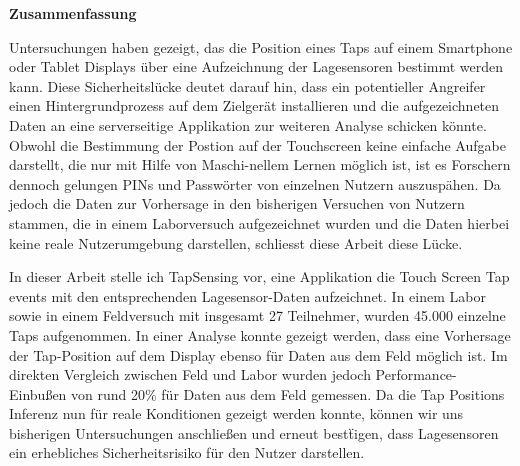 \thispagestyle{empty}
\vspace*{0.2cm}

\begin{center}
    \textbf{Zusammenfassung}
\end{center}

\vspace*{0.5cm}

\noindent

Untersuchungen haben gezeigt, das die Position eines Taps auf einem Smartphone oder Tablet Displays \"uber eine Aufzeichnung der Lagesensoren bestimmt werden kann. Diese Sicherheitsl\"ucke deutet darauf hin, dass ein potentieller Angreifer einen Hintergrundprozess auf dem Zielger\"at installieren und die aufgezeichneten Daten an eine serverseitige Applikation zur weiteren Analyse schicken k\"onnte. Obwohl die Bestimmung der Postion auf der Touchscreen keine einfache Aufgabe darstellt, die nur mit Hilfe von Maschi-nellem Lernen m\"oglich ist, ist es Forschern dennoch gelungen PINs und Passw\"orter von einzelnen Nutzern auszusp\"ahen. Da jedoch die Daten zur Vorhersage in den bisherigen Versuchen von Nutzern stammen, die in einem Laborversuch aufgezeichnet wurden und die Daten hierbei keine reale Nutzerumgebung darstellen, schliesst diese Arbeit diese L\"ucke.

In dieser Arbeit stelle ich TapSensing vor, eine Applikation die Touch Screen Tap events mit den entsprechenden Lagesensor-Daten aufzeichnet. In einem Labor sowie in einem Feldversuch mit insgesamt 27 Teilnehmer, wurden 45.000 einzelne Taps aufgenommen. In einer Analyse konnte gezeigt werden, dass eine Vorhersage der Tap-Position auf dem Display ebenso f\"ur Daten aus dem Feld m\"oglich ist. Im direkten Vergleich zwischen Feld und Labor wurden jedoch Performance-Einbußen von rund 20\% f\"ur Daten aus dem Feld gemessen. Da die Tap Positions Inferenz nun f\"ur reale Konditionen gezeigt werden konnte, k\"onnen wir uns bisherigen Untersuchungen anschließen und erneut best\"tigen, dass Lagesensoren ein erhebliches Sicherheitsrisiko f\"ur den Nutzer darstellen.

